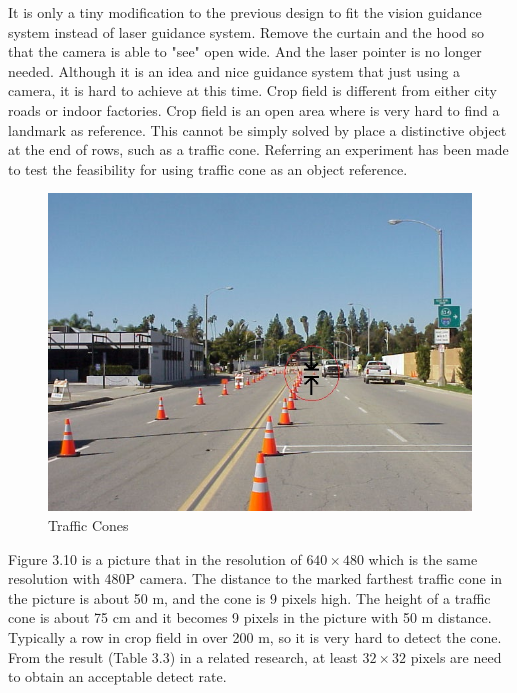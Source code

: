 \documentclass[letterpaper,12pt,oneside]{book}
\begin{document}
		It is only a tiny modification to the previous design to fit the vision guidance system instead of laser guidance system. Remove the curtain and the hood so that the camera is able to "see" open wide. And the laser pointer is no longer needed. Although it is an idea and nice guidance system that just using a camera, it is hard to achieve at this time. Crop field is different from either city roads or indoor factories. Crop field is an open area where is very hard to find a landmark as reference. This cannot be simply solved by place a distinctive object at the end of rows, such as a traffic cone. Referring an experiment has been made to test the feasibility for using traffic cone as an object reference. 
		\begin{figure}[ht!]
			\begin{center}
				\includegraphics[scale = 0.8]{cone.jpg}
				\caption{Traffic Cones}
			\end{center}
		\end{figure}
		Figure 3.10 is a picture that in the resolution of $640\times480$ which is the same resolution with 480P camera. The distance to the marked farthest traffic cone in the picture is about 50 m, and the cone is 9 pixels high. The height of a traffic cone is about 75 cm and it becomes 9 pixels in the picture with 50 m distance. Typically a row in crop field in over 200 m, so it is very hard to detect the cone. From the result (Table 3.3) in a related research, at least $32\times32$ pixels are need to obtain an acceptable detect rate. \cite{torralba2009many}
\end{document}
